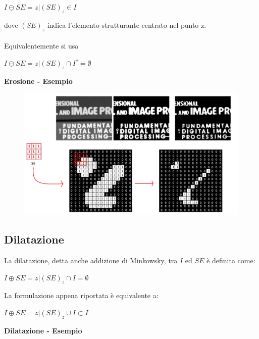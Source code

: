 \begin{center}
    $I \ominus SE = {z|(SE)_z \in I} $
\end{center}

dove $(SE)_z$ indica l'elemento strutturante centrato nel punto z.
\\\\
Equivalentemente si usa
\begin{center}
    $I \ominus SE = {z|(SE)_z \cap I^c = \emptyset}$
\end{center}
\textbf{Erosione - Esempio}

\begin{figure}[H]
    \centering
    \includegraphics[width=\linewidth, keepaspectratio]{capitoli/immagini/imgs/erosione-esempio.png}
\end{figure}

\newpage
\subsection{Dilatazione}

La dilatazione, detta anche addizione di Minkowsky, tra $I$ ed $SE$ è
definita come:

\begin{center}
    $I \oplus SE = {z|(SE)_z \cap I = \emptyset}$
\end{center}

La formulazione appena riportata è equivalente a:

\begin{center}
    $I \oplus SE = {z|(SE)_z \cup I} \subset I$
\end{center}

\textbf{Dilatazione - Esempio}


